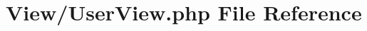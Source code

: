 \hypertarget{_user_view_8php}{}\section{View/\+User\+View.php File Reference}
\label{_user_view_8php}
